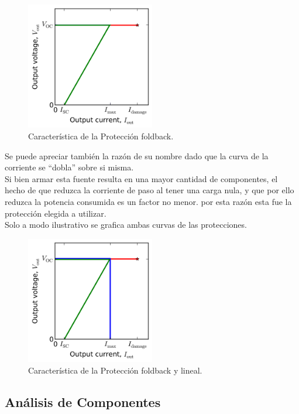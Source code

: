 \begin{figure}[H]
\centering
	\includegraphics[width=0.5\textwidth]{ImagenesEjercicio2/foldbackLineal.png}
	\caption{Característica de la Protección foldback.}
	\label{fig:circuitofoldbackcarac}
\end{figure}
Se puede apreciar también la razón de su nombre dado que la curva de la corriente se ``dobla'' sobre si misma.\\
Si bien armar esta fuente resulta en una mayor cantidad de componentes, el hecho de que reduzca la corriente de paso al tener una carga nula, y que por ello reduzca la potencia consumida es un factor no menor. por esta razón esta fue la protección elegida a utilizar.\\
Solo a modo ilustrativo se grafica ambas curvas de las protecciones.
\begin{figure}[H]
\centering
	\includegraphics[width=0.5\textwidth]{ImagenesEjercicio2/foldback.png}
	\caption{Característica de la Protección foldback y lineal.}
	\label{fig:circuitofoldbacklinealcarac}
\end{figure}

\subsection{Análisis de Componentes}
